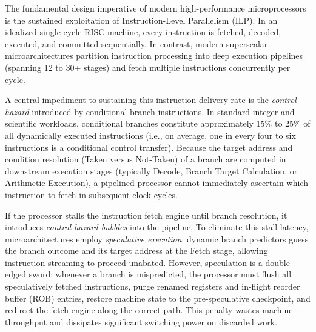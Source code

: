 \documentclass[11pt,a4paper]{article}
\begin{document}
The fundamental design imperative of modern high-performance microprocessors is the sustained exploitation of Instruction-Level Parallelism (ILP). In an idealized single-cycle RISC machine, every instruction is fetched, decoded, executed, and committed sequentially. In contrast, modern superscalar microarchitectures partition instruction processing into deep execution pipelines (spanning 12 to 30+ stages) and fetch multiple instructions concurrently per cycle. 

A central impediment to sustaining this instruction delivery rate is the \textit{control hazard} introduced by conditional branch instructions. In standard integer and scientific workloads, conditional branches constitute approximately 15\% to 25\% of all dynamically executed instructions (i.e., on average, one in every four to six instructions is a conditional control transfer). Because the target address and condition resolution (Taken versus Not-Taken) of a branch are computed in downstream execution stages (typically Decode, Branch Target Calculation, or Arithmetic Execution), a pipelined processor cannot immediately ascertain which instruction to fetch in subsequent clock cycles.

If the processor stalls the instruction fetch engine until branch resolution, it introduces \textit{control hazard bubbles} into the pipeline. To eliminate this stall latency, microarchitectures employ \textit{speculative execution}: dynamic branch predictors guess the branch outcome and its target address at the Fetch stage, allowing instruction streaming to proceed unabated. However, speculation is a double-edged sword: whenever a branch is mispredicted, the processor must flush all speculatively fetched instructions, purge renamed registers and in-flight reorder buffer (ROB) entries, restore machine state to the pre-speculative checkpoint, and redirect the fetch engine along the correct path. This penalty wastes machine throughput and dissipates significant switching power on discarded work.
\end{document}

